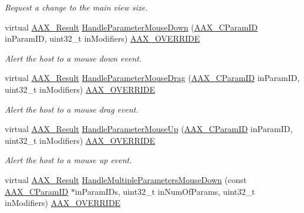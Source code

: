 \begin{DoxyCompactItemize}
\begin{DoxyCompactList}\small\item\em Request a change to the main view size. \end{DoxyCompactList}\item 
virtual \hyperlink{a00149_a4d8f69a697df7f70c3a8e9b8ee130d2f}{A\+A\+X\+\_\+\+Result} \hyperlink{a00142_a8fac19f54cce59191d449ef9fc45f03e}{Handle\+Parameter\+Mouse\+Down} (\hyperlink{a00149_a1440c756fe5cb158b78193b2fc1780d1}{A\+A\+X\+\_\+\+C\+Param\+I\+D} in\+Param\+I\+D, uint32\+\_\+t in\+Modifiers) \hyperlink{a00149_ac2f24a5172689ae684344abdcce55463}{A\+A\+X\+\_\+\+O\+V\+E\+R\+R\+I\+D\+E}
\begin{DoxyCompactList}\small\item\em Alert the host to a mouse down event. \end{DoxyCompactList}\item 
virtual \hyperlink{a00149_a4d8f69a697df7f70c3a8e9b8ee130d2f}{A\+A\+X\+\_\+\+Result} \hyperlink{a00142_a613b4445569ce046712e9913ca2c1578}{Handle\+Parameter\+Mouse\+Drag} (\hyperlink{a00149_a1440c756fe5cb158b78193b2fc1780d1}{A\+A\+X\+\_\+\+C\+Param\+I\+D} in\+Param\+I\+D, uint32\+\_\+t in\+Modifiers) \hyperlink{a00149_ac2f24a5172689ae684344abdcce55463}{A\+A\+X\+\_\+\+O\+V\+E\+R\+R\+I\+D\+E}
\begin{DoxyCompactList}\small\item\em Alert the host to a mouse drag event. \end{DoxyCompactList}\item 
virtual \hyperlink{a00149_a4d8f69a697df7f70c3a8e9b8ee130d2f}{A\+A\+X\+\_\+\+Result} \hyperlink{a00142_ac0f1faff626953da6934f060e5651eab}{Handle\+Parameter\+Mouse\+Up} (\hyperlink{a00149_a1440c756fe5cb158b78193b2fc1780d1}{A\+A\+X\+\_\+\+C\+Param\+I\+D} in\+Param\+I\+D, uint32\+\_\+t in\+Modifiers) \hyperlink{a00149_ac2f24a5172689ae684344abdcce55463}{A\+A\+X\+\_\+\+O\+V\+E\+R\+R\+I\+D\+E}
\begin{DoxyCompactList}\small\item\em Alert the host to a mouse up event. \end{DoxyCompactList}\item 
virtual \hyperlink{a00149_a4d8f69a697df7f70c3a8e9b8ee130d2f}{A\+A\+X\+\_\+\+Result} \hyperlink{a00142_a94c1f00cd25815df09fa0e5e51e0b7d6}{Handle\+Multiple\+Parameters\+Mouse\+Down} (const \hyperlink{a00149_a1440c756fe5cb158b78193b2fc1780d1}{A\+A\+X\+\_\+\+C\+Param\+I\+D} $\ast$in\+Param\+I\+Ds, uint32\+\_\+t in\+Num\+Of\+Params, uint32\+\_\+t in\+Modifiers) \hyperlink{a00149_ac2f24a5172689ae684344abdcce55463}{A\+A\+X\+\_\+\+O\+V\+E\+R\+R\+I\+D\+E}

\end{DoxyCompactItemize}

